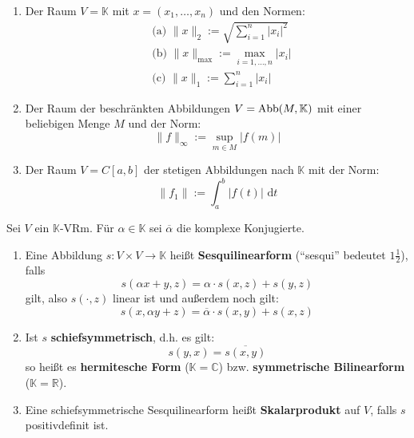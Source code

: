 \documentclass[parskip,a4paper,twoside,DIV15,BCOR12mm]{scrbook}
\begin{document}
\begin{example}
\begin{enumerate}
\item Der Raum $V=\mathbb{K}$ mit $x=(x_1,\ldots,x_n)$ und den Normen:
\begin{align*}
&\text{(a) }\|x\|_2:=\sqrt{\sum_{i=1}^n |x_i|^2}\\
&\text{(b) }\|x\|_{\max}:= \max_{i=1,\ldots,n}|x_i|\\
&\text{(c) }\|x\|_1:=\sum_{i=1}^n |x_i|
\end{align*}
\item Der Raum der beschränkten Abbildungen $V=\operatorname{Abb}(M,\mathbb{K})$ mit einer 
beliebigen Menge $M$ und der Norm:
\[\|f\|_\infty := \sup_{m\in M}|f(m)|\]
\item Der Raum $V=C[a,b]$ der stetigen Abbildungen nach $\mathbb{K}$ mit der Norm:
\[\|f_1\|:=\int_a^b |f(t)|\text{ d}t\]
\end{enumerate}
\end{example}

\begin{comment}
\begin{enumerate}
\item Jeder normierte Raum $(V,\|\cdot\|)$ besitzt die Metrik:
\[d(x,y):=\|x-y\|\]
\item In der Linearen Algebra tauchen hauptsächlich Normen auf, die mit
\textbf{Skalarprodukten} definiert werden.
\end{enumerate}
\end{comment}

\begin{definition}
\renewcommand{\labelenumi}{(\alph{enumi})}
Sei $V$ ein $\mathbb{K}$-VRm. Für $\alpha\in\mathbb{K}$ sei $\overline\alpha$
die komplexe Konjugierte.
\begin{enumerate}
\item Eine Abbildung $s:V\times V\to\mathbb{K}$ heißt \textbf{Sesquilinearform}
("`sesqui"' bedeutet $1\frac12$), falls
\[s(\alpha x+y,z)=\alpha \cdot s(x,z)+s(y,z)\]
gilt, also $s(\cdot,z)$ linear ist und außerdem noch gilt:
\[s(x,\alpha y+z)=\overline\alpha \cdot s(x,y)+s(x,z)\]
\item Ist $s$ \textbf{schiefsymmetrisch}, d.h. es gilt:
\[s(y,x)=\overline{s(x,y)}\]
so heißt es \textbf{hermitesche Form} ($\mathbb{K}=\mathbb{C}$) bzw.
\textbf{symmetrische Bilinearform} ($\mathbb{K}=\mathbb{R}$).
\item Eine schiefsymmetrische Sesquilinearform heißt \textbf{Skalarprodukt} auf $V$,
falls $s$ positivdefinit ist.
\end{enumerate}
\renewcommand{\labelenumi}{(\arabic{enumi})}
\end{definition}
\end{document}
